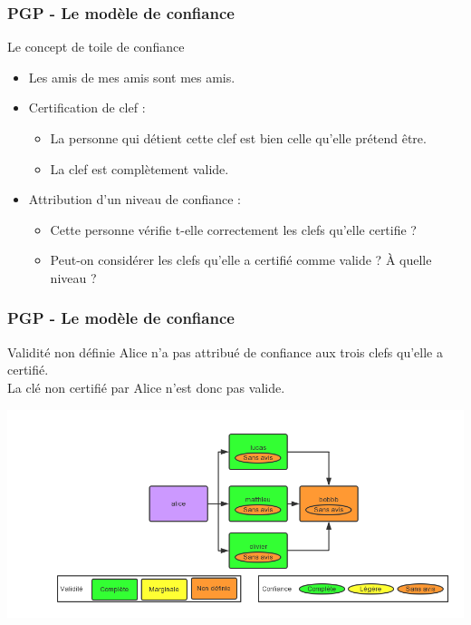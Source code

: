 \begin{frame}
  \frametitle{\color{white}PGP - Le modèle de confiance}
    \begin{block}{Le concept de toile de confiance}
    	\begin{itemize}
	  \item Les amis de mes amis sont mes amis.
	  \item Certification de clef :
	    \begin{itemize}
	     \item La personne qui détient cette clef est bien celle qu'elle prétend être.
	     \item La clef est complètement valide.
	    \end{itemize}
	  \item Attribution d'un niveau de confiance :
	    \begin{itemize}
	     \item Cette personne vérifie t-elle correctement les clefs qu'elle certifie ?
	     \item Peut-on considérer les clefs qu'elle a certifié comme valide ? À quelle niveau ?
	    \end{itemize}	  
       \end{itemize} 
    \end{block}
\end{frame}
\begin{frame}
  \frametitle{\color{white}PGP - Le modèle de confiance}
    \begin{block}{Validité non définie}
      Alice n'a pas attribué de confiance aux trois clefs qu'elle a certifié.\\
      La clé non certifié par Alice n'est donc pas valide.
    \end{block}
    \includegraphics[scale=0.3]{tdcdemoUndefined.png}
\end{frame}
